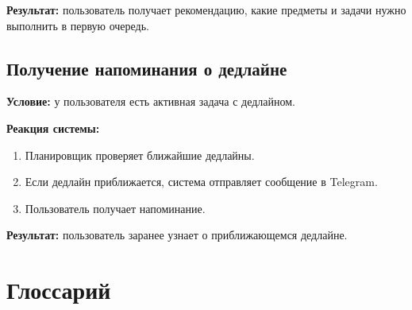 \documentclass[10pt,a4paper,final]{article} %
\begin{document}
\textbf{Результат:} пользователь получает рекомендацию, какие предметы и задачи нужно выполнить в первую очередь.

\subsection{Получение напоминания о дедлайне}

\textbf{Условие:} у пользователя есть активная задача с дедлайном.

\textbf{Реакция системы:}

\begin{enumerate}
    \item Планировщик проверяет ближайшие дедлайны.
    \item Если дедлайн приближается, система отправляет сообщение в Telegram.
    \item Пользователь получает напоминание.
\end{enumerate}

\textbf{Результат:} пользователь заранее узнает о приближающемся дедлайне.

\section{Глоссарий}
\end{document}

